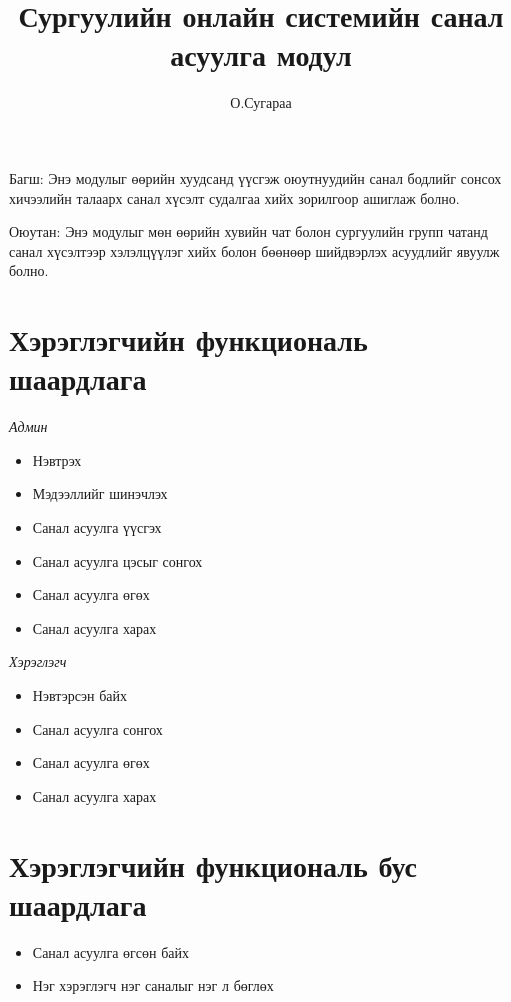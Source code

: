 \documentclass[12pt]{article}
\begin{document}
   
   {Багш:} Энэ модулыг  өөрийн хуудсанд үүсгэж оюутнуудийн санал бодлийг сонсох хичээлийн талаарх санал хүсэлт судалгаа хийх зорилгоор ашиглаж болно. 
   
   {Оюутан:} Энэ модулыг мөн өөрийн хувийн чат болон сургуулийн групп чатанд санал хүсэлтээр хэлэлцүүлэг хийх болон бөөнөөр шийдвэрлэх асуудлийг  явуулж болно.
	
	\title{Сургуулийн онлайн системийн санал асуулга модул}
	
	\author{О.Сугараа}
	
	\section{Хэрэглэгчийн функциональ шаардлага}
\textit {Админ}
		\begin{itemize}[label=*, nosep]
		\item Нэвтрэх
		\item Мэдээллийг шинэчлэх 
		\item Санал асуулга үүсгэх
		\item Санал асуулга цэсыг сонгох
		\item Санал асуулга өгөх
		\item Санал асуулга харах
	\end{itemize}

\textit {Хэрэглэгч}
	\begin{itemize}[label=*, nosep]
		\item Нэвтэрсэн байх
		\item Санал асуулга сонгох
		\item Санал асуулга өгөх 
		\item Санал асуулга харах
	\end{itemize}
	
	\section{Хэрэглэгчийн функциональ бус шаардлага}
\begin{itemize}[label=*, nosep]
	\item Санал асуулга өгсөн байх 
	\item Нэг хэрэглэгч нэг саналыг нэг л бөглөх
\end{itemize}
	\begin{center}
\end{center}
\end{document}
